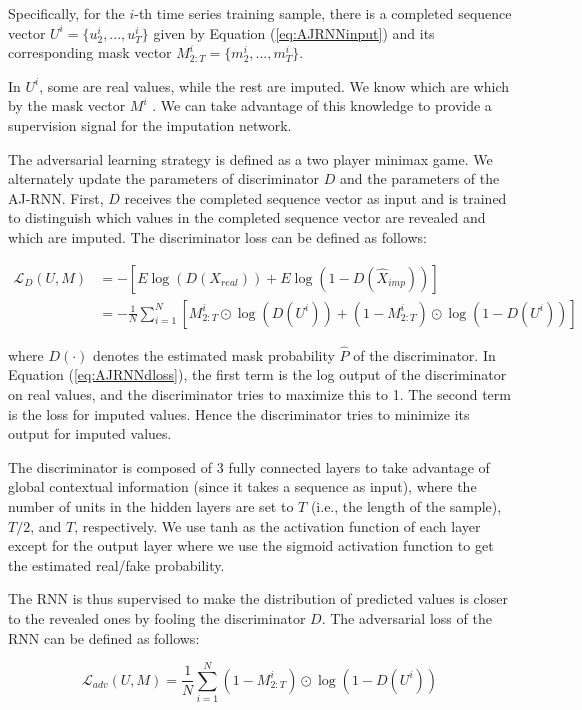 Specifically, for the $i$-th time series training sample, there is a completed sequence vector $U^i = \{u^i_2 , ..., u^i_T\}$
given by Equation (\ref{eq:AJRNNinput}) and its corresponding mask vector $M^i_{2:T} = \{m^i_2, ..., m^i_T \}$.

In $U^i$, some are real values, while the rest are imputed.
We know which are which by the mask vector $M^i$ . We can take advantage of this knowledge to provide a supervision signal for the imputation network.

The adversarial learning strategy is defined as a two player minimax game.
We alternately update the parameters of discriminator $D$ and the parameters of the AJ-RNN.
First, $D$ receives the completed sequence vector as input and is trained to distinguish which values in the completed sequence vector are revealed and which are imputed. 
The discriminator loss can be defined as follows:

\begin{align}
  \mathcal{L}_{D}(U, M) & = - [E \log(D(X_{real})) + E \log(1 - D(\hat{X}_{imp}))] \label{eq:AJRNNdloss} \\ 
                        & = - \frac{1}{N} \sum_{i=1}^N \left[ M^i_{2:T} \odot \log(D(U^i)) + (1 - M^i_{2:T}) \odot \log(1-D(U^i)) \right]
\end{align}

where $D(\cdot)$ denotes the estimated mask probability $\hat{P}$ of the discriminator. 
In Equation (\ref{eq:AJRNNdloss}), the first term is the log output of the discriminator on real values, and the discriminator tries to maximize this to 1.
The second term is the loss for imputed values.
Hence the discriminator tries to minimize its output for imputed values.

The discriminator is composed of 3 fully connected layers to take advantage of global contextual information (since it takes a sequence as input), where the number of units in the hidden layers are set to $T$ (i.e., the length of the sample), $T/2$, and $T$, respectively.
We use tanh as the activation function of each layer except for the output layer where we use the sigmoid activation function to get the estimated real/fake probability.

The RNN is thus supervised to make the distribution of predicted values is closer to the revealed ones by fooling the discriminator $D$. 
The adversarial loss of the RNN can be defined as follows:

\begin{equation}
  \mathcal{L}_{adv}(U, M) = \frac{1}{N} \sum_{i=1}^N  (1 - M^i_{2:T}) \odot \log(1 - D(U^i))
  \label{eq:AJRNNadvloss}
\end{equation}


